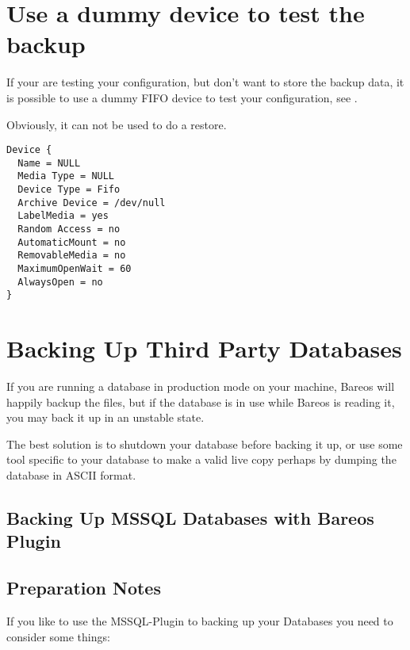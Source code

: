 
\section{Use a dummy device to test the backup}
\label{testbackup}
If your are testing your configuration, but don't want to store the backup data,
it is possible to use a dummy FIFO device to test your configuration, see .

Obviously, it can not be used to do a restore.

\footnotesize
\begin{verbatim}
Device {
  Name = NULL
  Media Type = NULL
  Device Type = Fifo
  Archive Device = /dev/null
  LabelMedia = yes
  Random Access = no
  AutomaticMount = no
  RemovableMedia = no
  MaximumOpenWait = 60
  AlwaysOpen = no
}
\end{verbatim}
\normalsize



\section{Backing Up Third Party Databases}
\label{BackingUPOtherDBs}

If you are running a database in production mode on your machine, Bareos will
happily backup the files, but if the database is in use while Bareos is
reading it, you may back it up in an unstable state.

The best solution is to shutdown your database before backing it up, or use
some tool specific to your database to make a valid live copy perhaps by
dumping the database in ASCII format.

\subsection{Backing Up MSSQL Databases with Bareos Plugin}
\label{BackingUPOtherDBs}

\subsection {Preparation Notes}
\label{Preparation Notes}
If you like to use the MSSQL-Plugin to backing up your Databases you need to consider some things:


